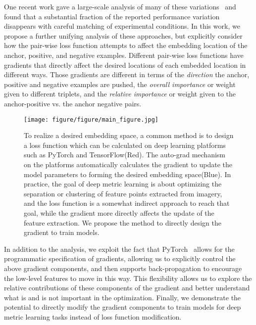 \documentclass[10pt,twocolumn,letterpaper]{article}
\begin{document}
One recent work gave a large-scale analysis of many of these variations~\cite{musgrave2020metric} and found that a substantial fraction of the reported performance variation disappears with careful matching of experimental conditions.  In this work, we propose a further unifying analysis of these approaches, but explicitly consider how the pair-wise loss function attempts to affect the embedding location of the anchor, positive, and negative examples.  Different pair-wise loss functions have gradients that directly affect the desired locations of each embedded location in different ways. Those gradients are different in terms of the {\it direction} the anchor, positive and negative examples are pushed, the {\it overall importance} or weight given to different triplets, and the {\it relative importance} or weight given to the anchor-positive vs. the anchor negative pairs.

\begin{figure}[t]
    \centering
    \texttt{[image: figure/figure/main\_figure.jpg]}
    \caption{To realize a desired embedding space, a common method is to design a loss function which can be calculated on deep learning platforms such as PyTorch and TensorFlow(Red). The auto-grad mechanism on the platforms automatically calculates the gradient to update the model parameters to forming the desired embedding space(Blue). In practice, the goal of deep metric learning is about optimizing the separation or clustering of feature points extracted from imagery, and the loss function is a somewhat indirect approach to reach that goal, while the gradient more directly affects the update of the feature extraction.   We propose the method to directly design the gradient to train models.
    }
    \label{fig:main}
\end{figure}

 
In addition to the analysis, we exploit the fact that PyTorch~\cite{pytorch} allows for the programmatic specification of gradients, allowing us to explicitly control the above gradient components, and then supports back-propagation to encourage the low-level features to move in this way. This flexibility allows us to explore the relative contributions of these components of the gradient and better understand what is and is not important in the optimization. Finally, we demonstrate the potential to directly modify the gradient components to train models for deep metric learning tasks instead of loss function modification.
\end{document}
